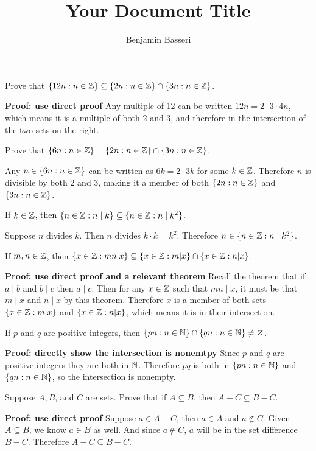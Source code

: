 \documentclass{article}
\title{Your Document Title}
\author{Benjamin Basseri}
\begin{document}
\maketitle


\begin{problem}
Prove that \(\{12n : n \in \mathbb{Z}\} \subseteq \{2n : n \in \mathbb{Z}\} \cap \{3n : n \in \mathbb{Z}\}\).
\end{problem}

\textbf{Proof: use direct proof}
Any multiple of 12 can be written \(12n = 2\cdot3\cdot4 n\), which means it is a multiple of both 2 and 3, and therefore in the intersection of the two sets on the right.

\begin{problem}
Prove that \(\{6n: n \in \mathbb{Z}\} = \{2n : n \in \mathbb{Z}\} \cap \{3n : n \in \mathbb{Z}\}\).
\end{problem}
Any \(n \in \{6n: n \in \mathbb{Z}\}\) can be written as \(6k = 2\cdot 3k\) for some \(k \in \mathbb{Z}\). Therefore \(n\) is divisible by both 2 and 3, making it a member of both \(\{2n : n \in \mathbb{Z}\}\) and \(\{3n : n \in \mathbb{Z}\}\).

\begin{problem}
If \(k \in \mathbb{Z}\), then $\{n \in \mathbb{Z}: n \mid k\} \subseteq \{n \in \mathbb{Z}: n \mid k^2\}$.
\end{problem}
Suppose $n$ divides $k$. Then $n$ divides $k\cdot k = k^2$. Therefore $n \in \{n\in \mathbb{Z}: n \mid k^2\}$.

\begin{problem}
If $m, n \in \mathbb{Z}$, then $\{x \in \mathbb{Z}: mn | x\} \subseteq \{x \in \mathbb{Z}: m | x\} \cap \{x \in \mathbb{Z}: n | x\}$.
\end{problem}
\textbf{Proof: use direct proof and a relevant theorem}
Recall the theorem that if $a \mid b$ and $b \mid c$ then $a \mid c$. Then for any $x \in \mathbb{Z}$ such that $mn \mid x$, it must be that $m \mid x$ and $n \mid x$ by this theorem. Therefore $x$ is a member of both sets $\{x \in \mathbb{Z}: m | x\}$ and $\{x \in \mathbb{Z}: n | x\}$, which means it is in their intersection.

\begin{problem}
If $p$ and $q$ are positive integers, then $\{pn : n \in \mathbb{N}\} \cap \{qn : n \in \mathbb{N}\} \neq \varnothing$.
\end{problem}
\textbf{Proof: directly show the intersection is nonemtpy}
Since $p$ and $q$ are positive integers they are both in $\mathbb{N}$. Therefore $pq$ is both in $\{pn : n \in \mathbb{N}\}$ and $\{qn : n \in \mathbb{N}\}$, so the intersection is nonempty.

\begin{problem}
Suppose $A, B$, and $C$ are sets. Prove that if $A \subseteq B$, then $A - C \subseteq B - C$.
\end{problem}
\textbf{Proof: use direct proof}
Suppose $a \in A - C$, then $a \in A$ and $a \not\in C$. Given $A \subseteq B$, we know $a \in B$ as well. And since $a \not\in C$, $a$ will be in the set difference $B - C$. Therefore $A - C \subseteq B - C$.
\end{document}
